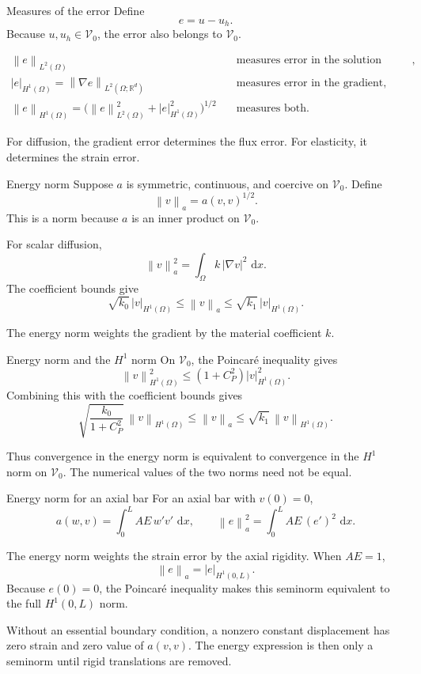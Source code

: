 \documentclass[11pt,aspectratio=169]{beamer}
\newcommand{\dd}{\,\mathrm{d}}
\newcommand{\Om}{\Omega}
\newcommand{\Vzero}{\mathcal V_0}
\newcommand{\norm}[2][]{\left\lVert#2\right\rVert_{#1}}
\newcommand{\seminorm}[2][]{\left\lvert#2\right\rvert_{#1}}
\begin{document}
\begin{frame}{Measures of the error}
Define
\[
  e=u-u_h.
\]
Because $u,u_h\in\Vzero$, the error also belongs to $\Vzero$.

\begin{align*}
  \norm[L^2(\Om)]{e}
  &\quad\text{measures error in the solution values},\\[2mm]
  \seminorm[H^1(\Om)]{e}
  =\norm[L^2(\Om;\mathbb R^d)]{\nabla e}
  &\quad\text{measures error in the gradient},\\[2mm]
  \norm[H^1(\Om)]{e}
  =\bigl(\norm[L^2(\Om)]{e}^2
  +\seminorm[H^1(\Om)]{e}^2\bigr)^{1/2}
  &\quad\text{measures both}.
\end{align*}

For diffusion, the gradient error determines the flux error. For elasticity,
it determines the strain error.
\end{frame}

\begin{frame}{Energy norm}
Suppose $a$ is symmetric, continuous, and coercive on $\Vzero$. Define
\[
  \boxed{\norm[a]{v}=a(v,v)^{1/2}.}
\]
This is a norm because $a$ is an inner product on $\Vzero$.

For scalar diffusion,
\[
  \norm[a]{v}^2
  =\int_\Om k\,|\nabla v|^2\,\dd x.
\]
The coefficient bounds give
\[
  \sqrt{k_0}\,\seminorm[H^1(\Om)]{v}
  \leq\norm[a]{v}
  \leq\sqrt{k_1}\,\seminorm[H^1(\Om)]{v}.
\]

The energy norm weights the gradient by the material coefficient $k$.
\end{frame}

\begin{frame}{Energy norm and the $H^1$ norm}
On $\Vzero$, the Poincar\'e inequality gives
\[
  \norm[H^1(\Om)]{v}^2
  \leq(1+C_P^2)\seminorm[H^1(\Om)]{v}^2.
\]
Combining this with the coefficient bounds gives
\[
  \boxed{
  \sqrt{\frac{k_0}{1+C_P^2}}\,
  \norm[H^1(\Om)]{v}
  \leq
  \norm[a]{v}
  \leq
  \sqrt{k_1}\,\norm[H^1(\Om)]{v}.}
\]

Thus convergence in the energy norm is equivalent to convergence in the
$H^1$ norm on $\Vzero$. The numerical values of the two norms need not be
equal.
\end{frame}

\begin{frame}{Energy norm for an axial bar}
For an axial bar with $v(0)=0$,
\[
  a(w,v)=\int_0^L AE\,w'v'\,\dd x,
  \qquad
  \norm[a]{e}^2=\int_0^L AE\,(e')^2\,\dd x.
\]

The energy norm weights the strain error by the axial rigidity. When $AE=1$,
\[
  \norm[a]{e}=\seminorm[H^1(0,L)]{e}.
\]
Because $e(0)=0$, the Poincar\'e inequality makes this seminorm equivalent to
the full $H^1(0,L)$ norm.

\vspace{0.2cm}
Without an essential boundary condition, a nonzero constant displacement has
zero strain and zero value of $a(v,v)$. The energy expression is then only a
seminorm until rigid translations are removed.
\end{frame}
\end{document}
